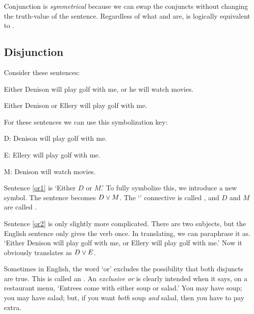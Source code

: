 Conjunction is \emph{symmetrical} because we can swap the conjuncts without changing the truth-value of the sentence. Regardless of what  and  are, \eand{} is logically equivalent to \eand{}.




\subsection{Disjunction}
Consider these sentences:
\begin{earg}
\item[\ex{or1}]Either Denison will play golf with me, or he will watch movies.
\item[\ex{or2}]Either Denison or Ellery will play golf with me. 
\end{earg}

For these sentences we can use this symbolization key:

\begin{ekey}
\item[D:] Denison will play golf with me.
\item[E:] Ellery will play golf with me.
\item[M:] Denison will watch movies.
\end{ekey}

Sentence \ref{or1} is `Either $D$ or $M$.' To fully symbolize this, we introduce a new symbol. The sentence becomes $D \vee M$. The `\eor' connective is called , and $D$ and $M$ are called .

Sentence \ref{or2} is only slightly more complicated. There are two subjects, but the English sentence only gives the verb once. In translating, we can paraphrase it as. `Either Denison will play golf with me, or Ellery will play golf with me.' Now it obviously translates as $D \vee E$.



Sometimes in English, the word `or' excludes the possibility that both disjuncts are true. This is called an .  An \emph{exclusive or} is clearly intended when it says, on a restaurant menu, `Entrees come with either soup or salad.' You may have soup; you may have salad; but, if you want \emph{both} soup \emph{and} salad, then you have to pay extra.

